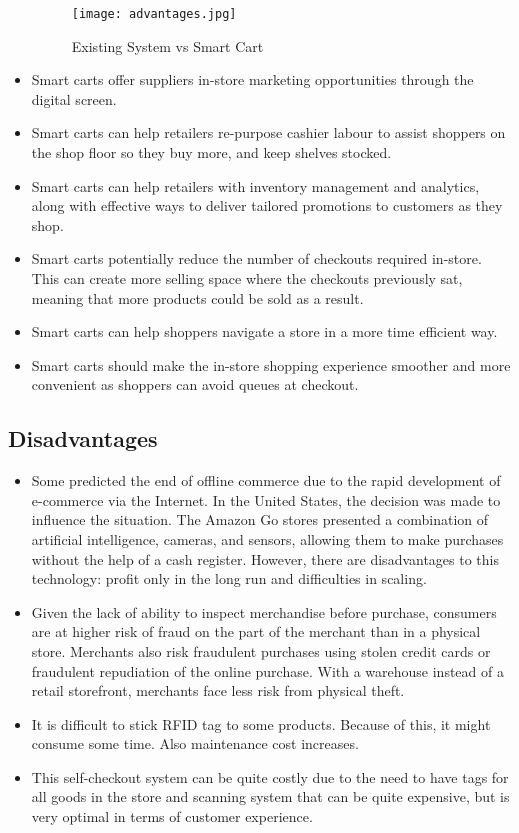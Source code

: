 \documentclass[12pt]{article}
\begin{document}
\begin{itemize}
\begin{figure}[h]
\texttt{[image: advantages.jpg]}
\centering
\caption{Existing System vs Smart Cart}
\end{figure}
\item Smart carts offer suppliers in-store marketing opportunities through the digital screen.
\item Smart carts can help retailers re-purpose cashier labour to assist shoppers on the shop floor so they buy more, and keep shelves stocked.
\item Smart carts can help retailers with inventory management and analytics, along with effective ways to deliver tailored promotions to customers as they shop.
\item Smart carts potentially reduce the number of checkouts required in-store. This can create more selling space where the checkouts previously sat, meaning that more products could be sold as a result. 
\item Smart carts can help shoppers navigate a store in a more time efficient way. 
\item Smart carts should make the in-store shopping experience smoother and more convenient as shoppers can avoid queues at checkout.
\end{itemize}
\subsection{Disadvantages}
\begin{itemize}
\item Some predicted the end of offline commerce due to the rapid development of e-commerce via the Internet. In the United States, the decision was made to influence the situation. The Amazon Go stores presented a combination of artificial intelligence, cameras, and sensors, allowing them to make purchases without the help of a cash register. However, there are disadvantages to this technology: profit only in the long run and difficulties in scaling.
\item Given the lack of ability to inspect merchandise before purchase, consumers are at higher risk of fraud on the part of the merchant than in a physical store. Merchants also risk fraudulent purchases using stolen credit cards or fraudulent repudiation of the online purchase. With a warehouse instead of a retail storefront, merchants face less risk from physical theft.
\item It is difficult to stick RFID tag to some products. Because of this, it might consume some time. Also maintenance cost increases.
\item This self-checkout system can be quite costly due to the need to have tags for all goods in the store and scanning system that can be quite expensive, but is very optimal in terms of customer experience.
\end{itemize}
\end{document}
